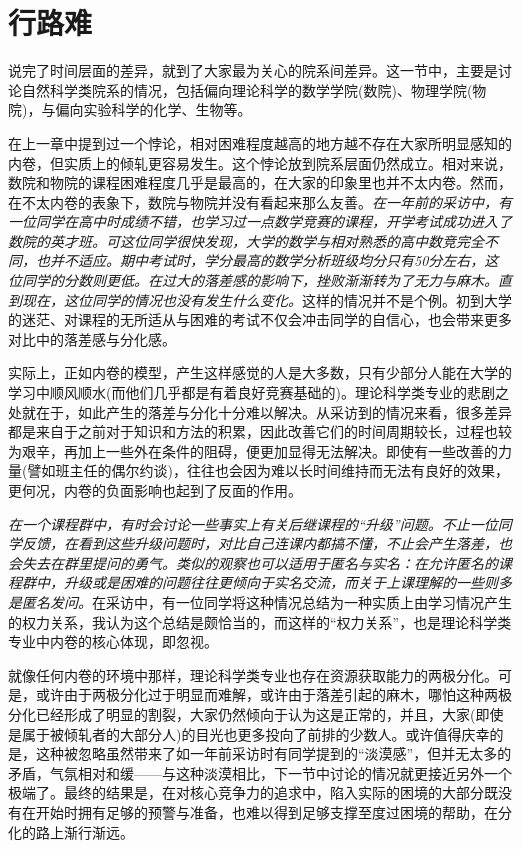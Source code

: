 \documentclass[UTF8,a4paper,fontset=windows,11pt,openany]{ctexbook}
\begin{document}
\section{行路难}

说完了时间层面的差异，就到了大家最为关心的院系间差异。这一节中，主要是讨论自然科学类院系的情况，包括偏向理论科学的数学学院(数院)、物理学院(物院)，与偏向实验科学的化学、生物等。

在上一章中提到过一个悖论，相对困难程度越高的地方越不存在大家所明显感知的内卷，但实质上的倾轧更容易发生。这个悖论放到院系层面仍然成立。相对来说，数院和物院的课程困难程度几乎是最高的，在大家的印象里也并不太内卷。然而，在不太内卷的表象下，数院与物院并没有看起来那么友善。\emph{在一年前的采访中，有一位同学在高中时成绩不错，也学习过一点数学竞赛的课程，开学考试成功进入了数院的英才班。可这位同学很快发现，大学的数学与相对熟悉的高中数竞完全不同，也并不适应。期中考试时，学分最高的数学分析班级均分只有50分左右，这位同学的分数则更低。在过大的落差感的影响下，挫败渐渐转为了无力与麻木。直到现在，这位同学的情况也没有发生什么变化。}这样的情况并不是个例。初到大学的迷茫、对课程的无所适从与困难的考试不仅会冲击同学的自信心，也会带来更多对比中的落差感与分化感。

实际上，正如内卷的模型，产生这样感觉的人是大多数，只有少部分人能在大学的学习中顺风顺水(而他们几乎都是有着良好竞赛基础的)。理论科学类专业的悲剧之处就在于，如此产生的落差与分化十分难以解决。从采访到的情况来看，很多差异都是来自于之前对于知识和方法的积累，因此改善它们的时间周期较长，过程也较为艰辛，再加上一些外在条件的阻碍，便更加显得无法解决。即使有一些改善的力量(譬如班主任的偶尔约谈)，往往也会因为难以长时间维持而无法有良好的效果，更何况，内卷的负面影响也起到了反面的作用。

\emph{在一个课程群中，有时会讨论一些事实上有关后继课程的“升级”问题。不止一位同学反馈，在看到这些升级问题时，对比自己连课内都搞不懂，不止会产生落差，也会失去在群里提问的勇气。类似的观察也可以适用于匿名与实名：在允许匿名的课程群中，升级或是困难的问题往往更倾向于实名交流，而关于上课理解的一些则多是匿名发问。}在采访中，有一位同学将这种情况总结为一种实质上由学习情况产生的权力关系，我认为这个总结是颇恰当的，而这样的“权力关系”，也是理论科学类专业中内卷的核心体现，即忽视。

就像任何内卷的环境中那样，理论科学类专业也存在资源获取能力的两极分化。可是，或许由于两极分化过于明显而难解，或许由于落差引起的麻木，哪怕这种两极分化已经形成了明显的割裂，大家仍然倾向于认为这是正常的，并且，大家(即使是属于被倾轧者的大部分人)的目光也更多投向了前排的少数人。或许值得庆幸的是，这种被忽略虽然带来了如一年前采访时有同学提到的“淡漠感”，但并无太多的矛盾，气氛相对和缓——与这种淡漠相比，下一节中讨论的情况就更接近另外一个极端了。最终的结果是，在对核心竞争力的追求中，陷入实际的困境的大部分既没有在开始时拥有足够的预警与准备，也难以得到足够支撑至度过困境的帮助，在分化的路上渐行渐远。
\end{document}
